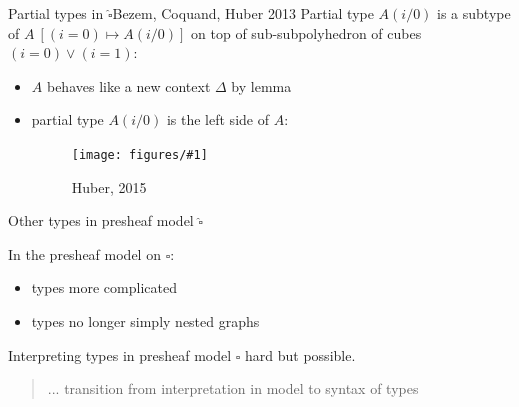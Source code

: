 \documentclass[english,handout]{beamer}
\newcommand{\fig}[2]{
    \begin{figure}\begin{center}\texttt{[image: figures/\#1]}\caption{#2\label{#1}}\end{center}
    \end{figure}}
\begin{document}
\begin{frame}{Partial types in $\widehat{\square}$}{Bezem, Coquand, Huber 2013}
 Partial type $A(i/0)$ is a subtype of $A\ [(i = 0) \mapsto A(i/0)]$ on top of sub-subpolyhedron of cubes $(i=0)\vee (i=1)$:
 
\begin{itemize}
    \item $A$ behaves like a new context $\Delta$ by lemma
    \item partial type $A(i/0)$ is the left side of $A$:
            \fig{types_side}{Huber, 2015}
\end{itemize}

 
 
\end{frame}

\begin{frame}{Other types in presheaf model $\widehat{\square}$}

In the presheaf model on $\square$:
\begin{itemize}
    \item types more complicated
    \item types no longer simply nested graphs
\end{itemize}


Interpreting types in presheaf model $\square$ hard but possible.


\begin{quotation}
 ... transition from interpretation in model to syntax of types
\end{quotation}


\end{frame}
\end{document}
